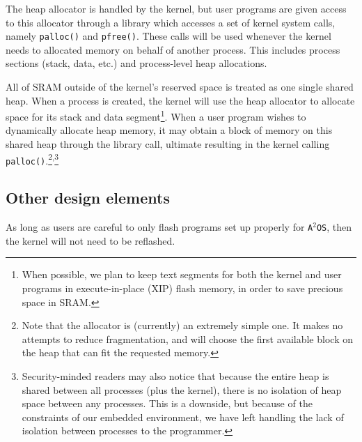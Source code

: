 \documentclass[12pt]{article}
\newcommand\fnsep{\textsuperscript{,}}
\newcommand{\osns}{\texttt{A$^2$OS}}
\begin{document}
The heap allocator is handled by the kernel, but user programs are given access
to this allocator through a library which accesses a set of kernel system calls,
namely \texttt{palloc()} and \texttt{pfree()}. These calls will be used whenever
the kernel needs to allocated memory on behalf of another process. This includes
process sections (stack, data, etc.) and process-level heap allocations.

All of SRAM outside of the kernel's reserved space is treated
as one single shared heap. When a process is created, the kernel will use the
heap allocator to allocate space for its stack and data segment\footnote{When
possible, we plan to keep text segments for both the kernel and user programs in
execute-in-place (XIP) flash memory, in order to save precious space in SRAM.}.
When a user program wishes to dynamically allocate heap memory, it may obtain
a block of memory on this shared heap through the library call, ultimate 
resulting in the kernel calling \texttt{palloc()}.\footnote{Note
that the allocator is (currently) an extremely simple one. It makes no attempts
to reduce fragmentation, and will choose the first available block on the heap
that can fit the requested memory.}\fnsep\footnote{Security-minded readers may
also notice that because the entire heap is shared between all processes (plus
the kernel), there is no isolation of heap space between any processes. This is
a downside, but because of the constraints of our embedded environment, we have
left handling the lack of isolation between processes to the programmer.}


\subsection{Other design elements}
As long as users are careful to only flash programs set up properly for \osns,
then the kernel will not need to be reflashed.
\end{document}
